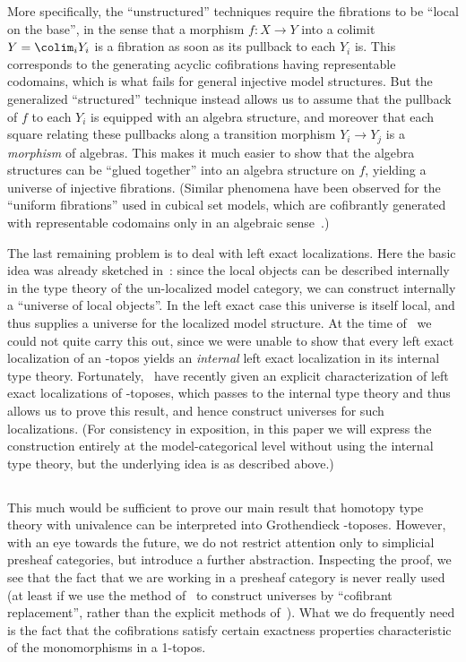 More specifically, the ``unstructured'' techniques require the fibrations to be ``local on the base'', in the sense that a morphism $f:X\to Y$ into a colimit $Y = \colim_i Y_i$ is a fibration as soon as its pullback to each $Y_i$ is.
This corresponds to the generating acyclic cofibrations having representable codomains, which is what fails for general injective model structures.
But the generalized ``structured'' technique instead allows us to assume that the pullback of $f$ to each $Y_i$ is equipped with an algebra structure, and moreover that each square relating these pullbacks along a transition morphism $Y_i\to Y_j$ is a \emph{morphism} of algebras.
This makes it much easier to show that the algebra structures can be ``glued together'' into an algebra structure on $f$, yielding a universe of injective fibrations.
(Similar phenomena have been observed for the ``uniform fibrations'' used in cubical set models, which are cofibrantly generated with representable codomains only in an algebraic sense~\cite{bch:tt-cubical,gs:uniform,awodey:qmc-cube}.)

The last remaining problem is to deal with left exact localizations.
Here the basic idea was already sketched in~\cite[Remarks 3.24 and A.29]{rss:modalities}: since the local objects can be described internally in the type theory of the un-localized model category, we can construct internally a ``universe of local objects''.
In the left exact case this universe is itself local, and thus supplies a universe for the localized model structure.
At the time of~\cite{rss:modalities} we could not quite carry this out, since we were unable to show that every left exact localization of an \io-topos yields an \emph{internal} left exact localization in its internal type theory.
Fortunately,~\cite{abfj:lexloc} have recently given an explicit characterization of left exact localizations of \io-toposes, which passes to the internal type theory and thus allows us to prove this result, and hence construct universes for such localizations.
(For consistency in exposition, in this paper we will express the construction entirely at the model-categorical level without using the internal type theory, but the underlying idea is as described above.)

\subsection{\Ttmts}
\label{sec:ttmts-intro}

This much would be sufficient to prove our main result that homotopy type theory with univalence can be interpreted into Grothendieck \io-toposes.
However, with an eye towards the future, we do not restrict attention only to simplicial presheaf categories, but introduce a further abstraction.
Inspecting the proof, we see that the fact that we are working in a presheaf category is never really used (at least if we use the method of~\cite{shulman:elreedy} to construct universes by ``cofibrant replacement'', rather than the explicit methods of~\cite{klv:ssetmodel,streicher:ttuniv}).
What we do frequently need is the fact that the cofibrations satisfy certain exactness properties characteristic of the monomorphisms in a 1-topos.

